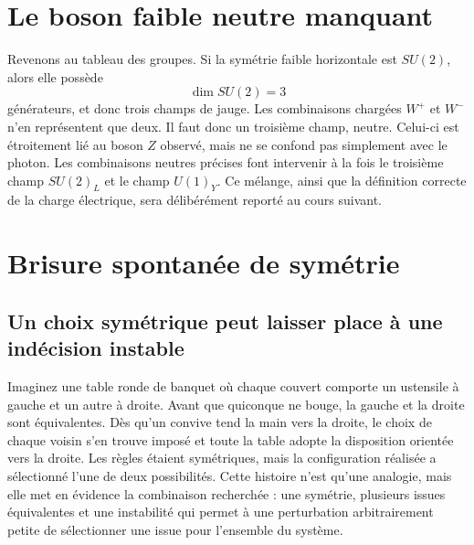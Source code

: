 \begin{classroomqa}
\end{classroomqa}

\section{Le boson faible neutre manquant}

Revenons au tableau des groupes. Si la symétrie faible horizontale est \(SU(2)\), alors elle possède
\begin{equation}
  \dim SU(2)=3
\end{equation}
générateurs, et donc trois champs de jauge. Les combinaisons chargées \(W^+\) et \(W^-\) n’en représentent que deux. Il faut donc un troisième champ, neutre. Celui-ci est étroitement lié au boson \(Z\) observé, mais ne se confond pas simplement avec le photon. Les combinaisons neutres précises font intervenir à la fois le troisième champ \(SU(2)_L\) et le champ \(U(1)_Y\). Ce mélange, ainsi que la définition correcte de la charge électrique, sera délibérément reporté au cours suivant.

\section{Brisure spontanée de symétrie}

\subsection{Un choix symétrique peut laisser place à une indécision instable}

Imaginez une table ronde de banquet où chaque couvert comporte un ustensile à gauche et un autre à droite. Avant que quiconque ne bouge, la gauche et la droite sont équivalentes. Dès qu’un convive tend la main vers la droite, le choix de chaque voisin s’en trouve imposé et toute la table adopte la disposition orientée vers la droite. Les règles étaient symétriques, mais la configuration réalisée a sélectionné l’une de deux possibilités. Cette histoire n’est qu’une analogie, mais elle met en évidence la combinaison recherchée : une symétrie, plusieurs issues équivalentes et une instabilité qui permet à une perturbation arbitrairement petite de sélectionner une issue pour l’ensemble du système.

